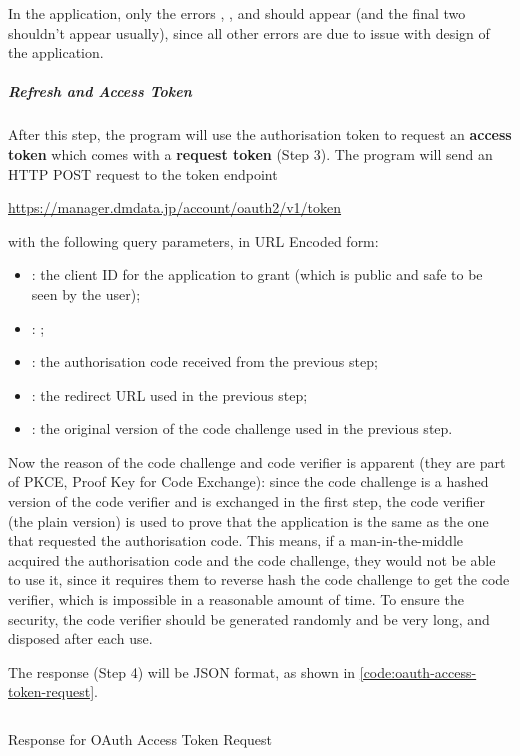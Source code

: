 In the application, only the errors , ,  and  should appear (and the final two shouldn't appear usually), since all other errors are due to issue with design of the application.

\subparagraph{Refresh and Access Token}

After this step, the program will use the authorisation token to request an \textbf{access token} which comes with a \textbf{request token} (Step 3). The program will send an HTTP POST request to the token endpoint
\begin{center}
    \url{https://manager.dmdata.jp/account/oauth2/v1/token}
\end{center}
with the following query parameters, in URL Encoded form:
\begin{itemize}
    \item {}: the client ID for the application to grant (which is public and safe to be seen by the user);
    \item {}: ;
    \item {}: the authorisation code received from the previous step;
    \item {}: the redirect URL used in the previous step;
    \item {}: the original version of the code challenge used in the previous step.
\end{itemize}

Now the reason of the code challenge and code verifier is apparent (they are part of PKCE, Proof Key for Code Exchange): since the code challenge is a hashed version of the code verifier and is exchanged in the first step, the code verifier (the plain version) is used to prove that the application is the same as the one that requested the authorisation code. This means, if a man-in-the-middle acquired the authorisation code and the code challenge, they would not be able to use it, since it requires them to reverse hash the code challenge to get the code verifier, which is impossible in a reasonable amount of time. To ensure the security, the code verifier should be generated randomly and be very long, and disposed after each use.

The response (Step 4) will be JSON format, as shown in \autoref{code:oauth-access-token-request}.

\begin{listing}[htp]
    \inputminted{json}{code/OAuthAccessTokenRequest.json}
    \caption{Response for OAuth Access Token Request}
    \label{code:oauth-access-token-request}
\end{listing}

